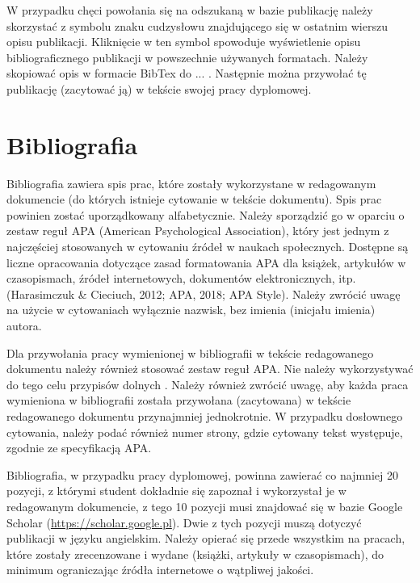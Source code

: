 W przypadku chęci powołania się na odszukaną w bazie publikację należy skorzystać z symbolu znaku cudzysłowu znajdującego się w ostatnim wierszu opisu publikacji. Kliknięcie w ten symbol spowoduje wyświetlenie opisu bibliograficznego publikacji w powszechnie używanych formatach. Należy skopiować opis w formacie BibTex do ... . Następnie można przywołać tę publikację (zacytować ją) w tekście swojej pracy dyplomowej.



\section{Bibliografia}

Bibliografia zawiera spis prac, które zostały wykorzystane w redagowanym dokumencie (do których istnieje cytowanie w tekście dokumentu). Spis prac powinien zostać uporządkowany alfabetycznie. Należy sporządzić go w oparciu o zestaw reguł APA (American Psychological Association), który jest jednym z najczęściej stosowanych w cytowaniu źródeł w naukach społecznych. Dostępne są liczne opracowania dotyczące zasad formatowania APA dla książek, artykułów w czasopismach, źródeł internetowych, dokumentów elektronicznych, itp. (Harasimczuk \& Cieciuch, 2012; APA, 2018; APA Style). Należy zwrócić uwagę na użycie w cytowaniach wyłącznie nazwisk, bez imienia (inicjału imienia) autora.

Dla przywołania pracy wymienionej w bibliografii w tekście redagowanego dokumentu należy również stosować zestaw reguł APA. Nie należy wykorzystywać do tego celu przypisów dolnych . Należy również zwrócić uwagę, aby każda praca wymieniona w bibliografii została przywołana (zacytowana) w tekście redagowanego dokumentu przynajmniej jednokrotnie. W przypadku dosłownego cytowania, należy podać również numer strony, gdzie cytowany tekst występuje, zgodnie ze specyfikacją APA.

Bibliografia, w przypadku pracy dyplomowej, powinna zawierać co najmniej 20 pozycji, z którymi student dokładnie się zapoznał i wykorzystał je w redagowanym dokumencie, z tego 10 pozycji musi znajdować się w bazie Google Scholar (\url{https://scholar.google.pl}). Dwie z tych pozycji muszą dotyczyć publikacji w języku angielskim. Należy opierać się przede wszystkim na pracach, które zostały zrecenzowane i wydane (książki, artykuły w czasopismach), do minimum ograniczając źródła internetowe o wątpliwej jakości.
